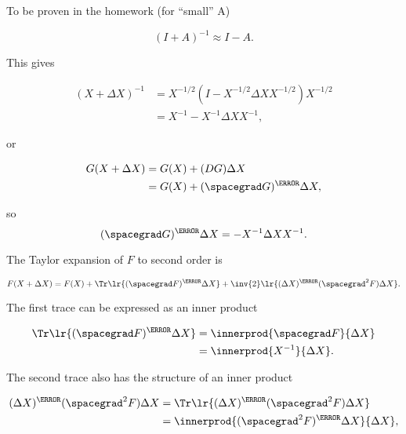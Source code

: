 To be proven in the homework (for ``small'' A)

\begin{dmath}\label{eqn:convexOptimizationLecture3:500}
(I + A)^{-1} \approx I - A.
\end{dmath}

This gives

\begin{dmath}\label{eqn:convexOptimizationLecture3:520}
\begin{aligned}
(X + \Delta X)^{-1}
&=
X^{-1/2} (I - X^{-1/2} \Delta X X^{-1/2} ) X^{-1/2} \\
&=
X^{-1} - X^{-1} \Delta X X^{-1},
\end{aligned}
\end{dmath}

or

\begin{dmath}\label{eqn:convexOptimizationLecture3:800}
\begin{aligned}
G(X + \Delta X)
&= G(X) + (D G) \Delta X \\
&= G(X) + (\spacegrad G)^\T \Delta X,
\end{aligned}
\end{dmath}

so
\begin{dmath}\label{eqn:convexOptimizationLecture3:820}
(\spacegrad G)^\T \Delta X
=
- X^{-1} \Delta X X^{-1}.
\end{dmath}

The Taylor expansion of \( F \) to second order is

\begin{dmath}\label{eqn:convexOptimizationLecture3:840}
F(X + \Delta X)
=
F(X)
+
\Tr \lr{ (\spacegrad F)^\T \Delta X}
+
\inv{2}
\lr{ (\Delta X)^\T (\spacegrad^2 F) \Delta X}.
\end{dmath}

The first trace can be expressed as an inner product

\begin{dmath}\label{eqn:convexOptimizationLecture3:860}
\begin{aligned}
\Tr \lr{ (\spacegrad F)^\T \Delta X}
&=
\innerprod{ \spacegrad F }{\Delta X} \\
&=
\innerprod{ X^{-1} }{\Delta X}.
\end{aligned}
\end{dmath}

The second trace also has the structure of an inner product

\begin{dmath}\label{eqn:convexOptimizationLecture3:880}
\begin{aligned}
(\Delta X)^\T (\spacegrad^2 F) \Delta X
&=
\Tr \lr{ (\Delta X)^\T (\spacegrad^2 F) \Delta X} \\
&=
\innerprod{ (\spacegrad^2 F)^\T \Delta X }{\Delta X},
\end{aligned}
\end{dmath}

